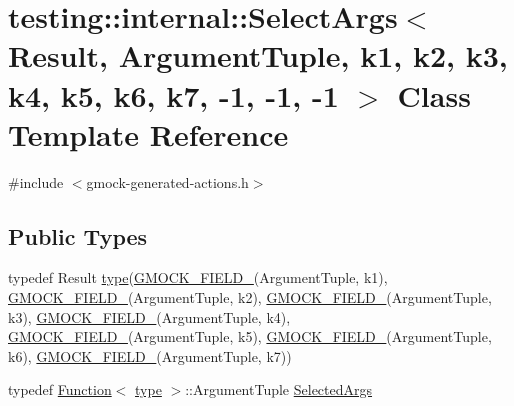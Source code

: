 \hypertarget{classtesting_1_1internal_1_1SelectArgs_3_01Result_00_01ArgumentTuple_00_01k1_00_01k2_00_01k3_00_39929402cb68b57f60e280a41eb60fed}{}\section{testing\+::internal\+::Select\+Args$<$ Result, Argument\+Tuple, k1, k2, k3, k4, k5, k6, k7, -\/1, -\/1, -\/1 $>$ Class Template Reference}
\label{classtesting_1_1internal_1_1SelectArgs_3_01Result_00_01ArgumentTuple_00_01k1_00_01k2_00_01k3_00_39929402cb68b57f60e280a41eb60fed}


{\ttfamily \#include $<$gmock-\/generated-\/actions.\+h$>$}

\subsection*{Public Types}
\begin{DoxyCompactItemize}
\item 
typedef Result \mbox{\hyperlink{classtesting_1_1internal_1_1SelectArgs_3_01Result_00_01ArgumentTuple_00_01k1_00_01k2_00_01k3_00_39929402cb68b57f60e280a41eb60fed_a9a44113ab59893cfc38ae45451a5b654}{type}}(\mbox{\hyperlink{gmock-generated-actions_8h_a6eb3ce92b0613603057a20ec9e593317}{G\+M\+O\+C\+K\+\_\+\+F\+I\+E\+L\+D\+\_\+}}(Argument\+Tuple, k1), \mbox{\hyperlink{gmock-generated-actions_8h_a6eb3ce92b0613603057a20ec9e593317}{G\+M\+O\+C\+K\+\_\+\+F\+I\+E\+L\+D\+\_\+}}(Argument\+Tuple, k2), \mbox{\hyperlink{gmock-generated-actions_8h_a6eb3ce92b0613603057a20ec9e593317}{G\+M\+O\+C\+K\+\_\+\+F\+I\+E\+L\+D\+\_\+}}(Argument\+Tuple, k3), \mbox{\hyperlink{gmock-generated-actions_8h_a6eb3ce92b0613603057a20ec9e593317}{G\+M\+O\+C\+K\+\_\+\+F\+I\+E\+L\+D\+\_\+}}(Argument\+Tuple, k4), \mbox{\hyperlink{gmock-generated-actions_8h_a6eb3ce92b0613603057a20ec9e593317}{G\+M\+O\+C\+K\+\_\+\+F\+I\+E\+L\+D\+\_\+}}(Argument\+Tuple, k5), \mbox{\hyperlink{gmock-generated-actions_8h_a6eb3ce92b0613603057a20ec9e593317}{G\+M\+O\+C\+K\+\_\+\+F\+I\+E\+L\+D\+\_\+}}(Argument\+Tuple, k6), \mbox{\hyperlink{gmock-generated-actions_8h_a6eb3ce92b0613603057a20ec9e593317}{G\+M\+O\+C\+K\+\_\+\+F\+I\+E\+L\+D\+\_\+}}(Argument\+Tuple, k7))
\item 
typedef \mbox{\hyperlink{structtesting_1_1internal_1_1Function}{Function}}$<$ \mbox{\hyperlink{classtesting_1_1internal_1_1SelectArgs_3_01Result_00_01ArgumentTuple_00_01k1_00_01k2_00_01k3_00_39929402cb68b57f60e280a41eb60fed_a9a44113ab59893cfc38ae45451a5b654}{type}} $>$\+::Argument\+Tuple \mbox{\hyperlink{classtesting_1_1internal_1_1SelectArgs_3_01Result_00_01ArgumentTuple_00_01k1_00_01k2_00_01k3_00_39929402cb68b57f60e280a41eb60fed_a128e1c494007a7bffd3d0a88a4dd7825}{Selected\+Args}}
\end{DoxyCompactItemize}
